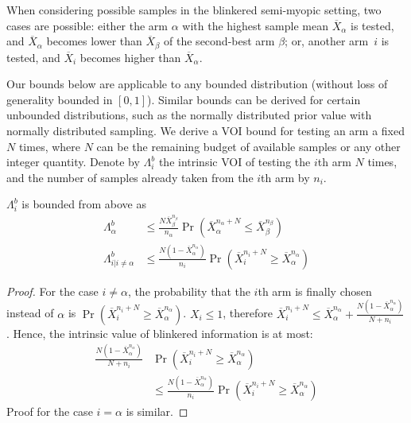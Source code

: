 When considering possible samples in the blinkered semi-myopic setting,
two cases are possible: either
	the arm $\alpha$ with the highest sample mean $\overline
  	X_\alpha$ is tested, and $\overline X_\alpha$ becomes lower than
 	$\overline X_\beta$ of the second-best arm $\beta$;
or, 
	another arm~$i$ is tested, and $\overline X_i$ becomes higher
    than $\overline X_\alpha$.


Our bounds below are applicable to any bounded distribution (without loss of generality 
bounded in $[0,1]$). Similar
bounds can be derived for certain unbounded distributions, such as the
normally distributed prior value with normally distributed
sampling.
We derive a VOI bound for testing an arm a fixed $N$ times,
where $N$ can be the remaining budget of available samples or
any other integer quantity.
Denote by  $\Lambda_i^b$ the intrinsic VOI of testing the $i$th arm
$N$ times, and the number of
samples already taken from the $i$th arm by $n_i$.
\begin{thm} $\Lambda_i^b$ is bounded from above as
\begin{align}
\label{eqn:thm-be}
  \Lambda_\alpha^b&\le \frac {N \overline X_\beta^{n_\beta}} {n_\alpha} \Pr(\overline X_\alpha^{n_\alpha+N}\le\overline X_\beta^{n_\beta})\nonumber\\
\Lambda_{i|i\ne\alpha}^b&\le \frac {N(1-\overline X_\alpha^{n_\alpha})} {n_i}\Pr(\overline   X_i^{{n_i}+N}\ge\overline X_\alpha^{n_\alpha})
\end{align}
\label{thm:be}
\end{thm}
\begin{proof} For the case $i\ne \alpha$, the probability that the
	  $i$th arm is finally chosen instead of $\alpha$ is
	  $\Pr(\overline X_i^{n_i+N} \ge \overline X_\alpha^{n_\alpha})$. $X_i \le 1$,
	  therefore $\overline X_i^{n_i+N}\le \overline
	  X_\alpha^{n_\alpha}+\frac {N(1-\overline X_\alpha^{n_\alpha})} {N+n_i}$. Hence, the intrinsic value of blinkered
	  information is at most: 
	\begin{align}
	\label{eq:simplistic}
	\frac{ N(1-\overline  X_\alpha^{n_\alpha})}
	  {N+n_i}&\Pr(\overline X_i^{{n_i}+N}\ge\overline X_\alpha^{n_\alpha})\nonumber \\
	&\le\frac{ N(1-\overline  X_\alpha^{n_\alpha})}
	{n_i}\Pr(\overline X_i^{{n_i}+N}\ge\overline X_\alpha^{n_\alpha})
	\end{align}
	  Proof for the case $i=\alpha$ is similar.
\end{proof}


